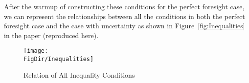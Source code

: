 \documentclass[\econtexRoot/BufferStockTheory]{subfiles}
\begin{document}
After the warmup of constructing these conditions for the perfect foresight case, we can represent the relationships between all the conditions in both the perfect foresight case and the case with uncertainty as shown in Figure~\ref{fig:Inequalities} in the paper (reproduced here).

\begin{figure}[h]
  \centerline{
    \texttt{[image: \\FigDir/Inequalities]}
  }
  \caption{Relation of All Inequality Conditions} \label{fig:InequalitiesApp}
\end{figure}

\onlyinsubfile{}
\end{document}
